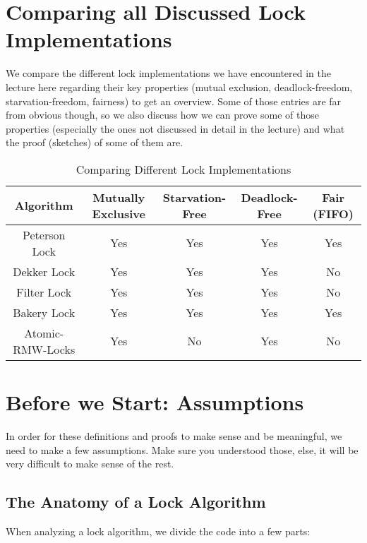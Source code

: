 \documentclass{article}
\begin{document}
    \section{Comparing all Discussed Lock Implementations}
    We compare the different lock implementations we have encountered in the lecture here regarding their key properties (mutual exclusion, deadlock-freedom, starvation-freedom, fairness) to get an overview. Some of those entries are far from obvious though, so we also discuss how we can prove some of those properties (especially the ones not discussed in detail in the lecture) and what the proof (sketches) of some of them are.

    \begin{table}
        \centering
            \begin{tabular}{|c||c|c|c|c|}
                \hline
                Algorithm & Mutually Exclusive & Starvation-Free & Deadlock-Free & Fair (FIFO) \\
                \hline
                Peterson Lock & Yes & Yes & Yes & Yes \\
                Dekker Lock & Yes & Yes & Yes & No \\
                Filter Lock & Yes & Yes & Yes & No \\
                Bakery Lock & Yes & Yes & Yes & Yes \\
                Atomic-RMW-Locks & Yes & No & Yes & No \\
                \hline
            \end{tabular}
            \caption{Comparing Different Lock Implementations}
            \label{tab:example}
    \end{table}

    \section{Before we Start: Assumptions}
    In order for these definitions and proofs to make sense and be meaningful, we need to make a few assumptions. Make sure you understood those, else, it will be very difficult to make sense of the rest.

    \subsection{The Anatomy of a Lock Algorithm}
    \label{anatomy}
    When analyzing a lock algorithm, we divide the code into a few parts:
\end{document}

